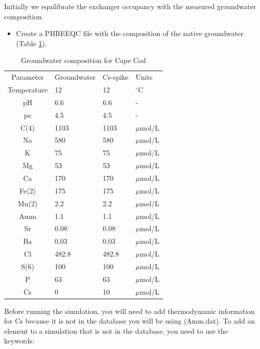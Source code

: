 Initially we equilibrate the exchanger occupancy with the measured groundwater composition.

\begin{itemize}
\item Create a PHREEQC file with the composition of the native groundwater (Table \ref{tab:capecod}).
\end{itemize}
 
\begin{table}[h]
\begin{center}
\centering
\caption{Groundwater composition for Cape Cod}
\begin{tabular}{clll}
\toprule
Parameter	  & Groundwater	& Cs-spike	& Units \\
Temperature	&     12	    &   12	    & $^\circ$C   \\
      pH	  &    6.6	    &   6.6     & -           \\	
      pe	  &    4.5	    &   4.5	    & -           \\
     C(4)	  &   1103	    &  1103	    & $\mu$mol/L  \\
      Na	  &    580	    &   580	    & $\mu$mol/L  \\
K	  & 75	& 75	& $\mu$mol/L \\
Mg	& 53	& 53	& $\mu$mol/L \\
Ca	& 170 &	170	& $\mu$mol/L \\
Fe(2)	& 175	& 175	& $\mu$mol/L  \\
Mn(2)	& 2.2	& 2.2	& $\mu$mol/L  \\
Amm	  & 1.1	& 1.1 &	$\mu$mol/L  \\
Sr	  & 0.08	& 0.08	& $\mu$mol/L  \\
Ba	  & 0.03	& 0.03	& $\mu$mol/L  \\
Cl	  & 482.8	& 482.8	& $\mu$mol/L  \\
S(6)	& 100	  & 100	  & $\mu$mol/L  \\
P	    & 63	  & 63	  & $\mu$mol/L  \\
Cs	  & 0	    & 10	  & $\mu$mol/L  \\ 
\bottomrule
\end{tabular}
\label{tab:capecod}
\end{center}
\end{table}

Before running the simulation, you will need to add thermodynamic information 
for Cs because it is not in the database you will be using (Amm.dat).  
To add an element to a simulation that is not in the database, you need to use the keywords:

